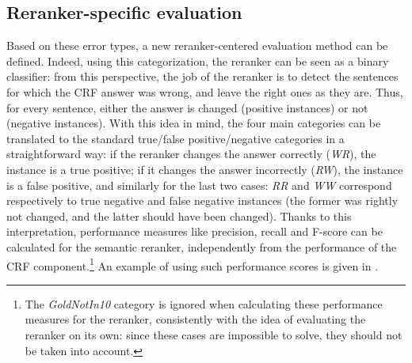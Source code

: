 \documentclass[output=paper
,modfonts
,nonflat]{langsci/langscibook}
\begin{document}
\subsection{Reranker-specific evaluation}
\label{moreau:sec:rerankerEval}


Based on these error types, a new reranker-centered evaluation method
can be defined. Indeed, using this categorization, the reranker can be
seen as a binary classifier: from this perspective, the job of the
reranker is to detect the sentences for which the CRF answer was
wrong, and leave the right ones as they are. Thus, for every sentence,
either the answer is changed (positive instances) or not (negative
instances). With this idea in mind, the four main categories can be
translated to the standard true/false positive/negative categories in
a straightforward way: if the reranker changes the answer correctly
({\it WR}), the instance is a true positive; if it changes the answer
incorrectly ({\it RW}), the instance is a false positive, and
similarly for the last two cases: {\it RR} and {\it WW} correspond
respectively to true negative and false negative instances (the former
was rightly not changed, and the latter should have been
changed). Thanks to this interpretation, performance measures like
precision, recall and F-score can be calculated for the semantic
reranker, independently from the performance of the CRF
component.\footnote{The {\it GoldNotIn10} category is ignored when
  calculating these performance measures for the reranker,
  consistently with the idea of evaluating the reranker on its own:
  since these cases are impossible to solve, they should not be taken
  into account.} An example of using such performance scores is given
in .
\end{document}
